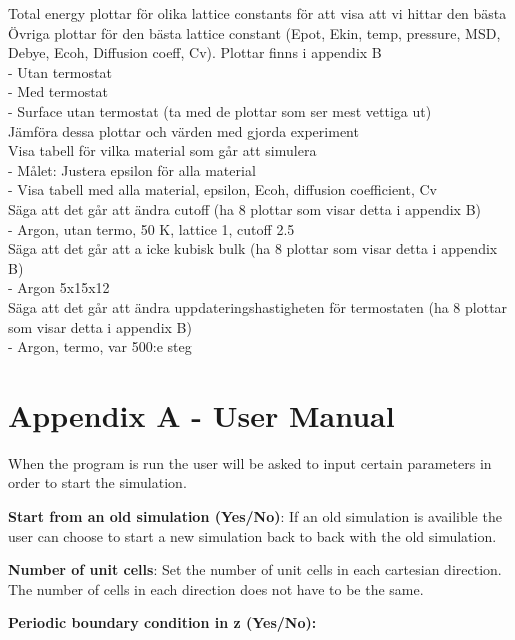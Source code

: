 \documentclass[12pt,a4paper]{article}
\begin{document}
Total energy plottar för olika lattice constants för att visa att vi hittar den bästa\\
Övriga plottar för den bästa lattice constant (Epot, Ekin, temp, pressure, MSD, Debye, Ecoh, Diffusion coeff, Cv). Plottar finns i appendix B\\
	- Utan termostat\\
	- Med termostat\\
	- Surface utan termostat (ta med de plottar som ser mest vettiga ut)\\
Jämföra dessa plottar och värden med gjorda experiment\\
Visa tabell för vilka material som går att simulera\\
	- Målet: Justera epsilon för alla material\\
	- Visa tabell med alla material, epsilon, Ecoh, diffusion coefficient, Cv\\
Säga att det går att ändra cutoff (ha 8 plottar som visar detta i appendix B)\\
	- Argon, utan termo, 50 K, lattice 1, cutoff 2.5\\
Säga att det går att a icke kubisk bulk (ha 8 plottar som visar detta i appendix B)\\
	- Argon 5x15x12\\
Säga att det går att ändra uppdateringshastigheten för termostaten (ha 8 plottar som visar detta i appendix B)\\
	- Argon, termo, var 500:e steg\\

\newpage

\section*{Appendix A - User Manual}

\label{sec:AppendixA}
When the program is run the user will be asked to input certain parameters in order to start the simulation.

\textbf{Start from an old simulation (Yes/No)}: If an old simulation is availible the user can choose to start a new simulation back to back with the old simulation.  

\textbf{Number of unit cells}: Set the number of unit cells in each cartesian direction. The number of cells in each direction does not have to be the same.

\textbf{Periodic boundary condition in z (Yes/No):} 
\end{document}
